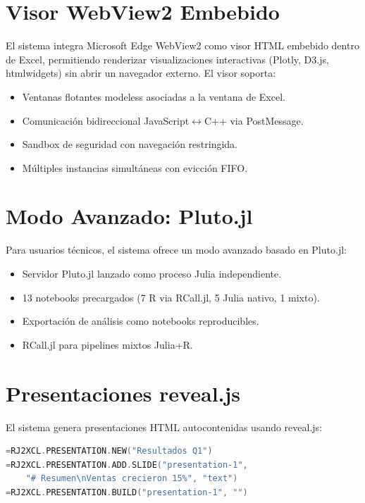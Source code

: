 \documentclass[12pt, a4paper]{report}
\begin{document}
\section{Visor WebView2 Embebido}

El sistema integra Microsoft Edge WebView2 como visor HTML embebido dentro de Excel, permitiendo renderizar visualizaciones interactivas (Plotly, D3.js, htmlwidgets) sin abrir un navegador externo. El visor soporta:

\begin{itemize}
    \item Ventanas flotantes modeless asociadas a la ventana de Excel.
    \item Comunicación bidireccional JavaScript$\leftrightarrow$C++ via PostMessage.
    \item Sandbox de seguridad con navegación restringida.
    \item Múltiples instancias simultáneas con evicción FIFO.
\end{itemize}

\section{Modo Avanzado: Pluto.jl}

Para usuarios técnicos, el sistema ofrece un modo avanzado basado en Pluto.jl:

\begin{itemize}
    \item Servidor Pluto.jl lanzado como proceso Julia independiente.
    \item 13 notebooks precargados (7 R via RCall.jl, 5 Julia nativo, 1 mixto).
    \item Exportación de análisis como notebooks reproducibles.
    \item RCall.jl para pipelines mixtos Julia+R.
\end{itemize}

\section{Presentaciones reveal.js}

El sistema genera presentaciones HTML autocontenidas usando reveal.js:

\begin{lstlisting}[language=C++, caption={Flujo de creación de presentaciones desde Excel}]
=RJ2XCL.PRESENTATION.NEW("Resultados Q1")
=RJ2XCL.PRESENTATION.ADD.SLIDE("presentation-1",
    "# Resumen\nVentas crecieron 15%", "text")
=RJ2XCL.PRESENTATION.BUILD("presentation-1", "")
\end{lstlisting}
\end{document}
